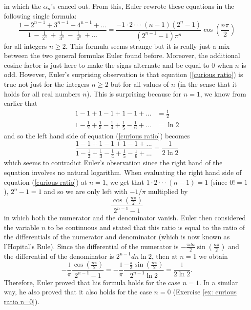 in which the $\alpha_n$'s cancel out. From this, Euler rewrote these equations in the following single formula:
\begin{equation} \label{curious ratio}
    \boxed{\frac{1 - 2^{n-1} + 3^{n-1} - 4^{n-1}+ ...}{\displaystyle 1 \, - \, \frac{1}{2^n} \ + \: \frac{1}{3^n} \ - \: \frac{1}{4^n} \ + ...} = \frac{-1\cdot 2 \cdot \cdot \cdot (n-1)(2^n - 1)}{(2^{n-1} - 1)\pi^n}\cos \left(\frac{n \pi }{2}\right)}
\end{equation}
for all integers $n \geq 2$. This formula seems strange but it is really just a mix between the two general formulas Euler found before. Moreover, the additional cosine factor is just here to make the signs alternate and be equal to $0$ when $n$ is odd. However, Euler's surprising observation is that equation (\ref{curious ratio}) is true not just for the integers $n \geq 2$ but for all values of $n$ (in the sense that it holds for all real numbers $n$). This is surprising because for $n = 1$, we know from earlier that
\begin{align*}
    1 - 1 + 1 - 1 + 1 - 1 + ... &= \frac{1}{2} \\
    1 - \frac{1}{2} + \frac{1}{3} - \frac{1}{4} + \frac{1}{5} - \frac{1}{6} + \dots &= \ln 2
\end{align*}
and so the left hand side of equation (\ref{curious ratio}) becomes
$$\frac{1 - 1 + 1 - 1 + 1 - 1 + ...}{\displaystyle 1 - \frac{1}{2} + \frac{1}{3} - \frac{1}{4} + \frac{1}{5} - \frac{1}{6} + \dots} = \frac{1}{2\ln 2}$$
which seems to contradict Euler's observation since the right hand of the equation involves no natural logarithm. When evaluating the right hand side of equation (\ref{curious ratio}) at $n = 1$, we get that $1\cdot 2 \cdot \cdot \cdot (n-1) = 1$ (since $0! = 1$), $2^n - 1 = 1$ and so we are only left with $-1/\pi$ multiplied by
$$\frac{\cos\left(\frac{n\pi}{2}\right)}{2^{n-1} - 1}$$
in which both the numerator and the denominator vanish. Euler then considered the variable $n$ to be continuous and stated that this ratio is equal to the ratio of the differentials of the numerator and denominator (which is now known as l'Hopital's Rule). Since the differential of the numerator is $-\frac{\pi dn}{2}\sin(\frac{n\pi}{2})$ and the differential of the denominator is $2^{n-1}dn \ln 2$, then at $n = 1$ we obtain
$$-\frac{1}{\pi}\frac{\cos\left(\frac{n\pi}{2}\right)}{2^{n-1} - 1} = -\frac{1}{\pi}\frac{-\frac{\pi}{2}\sin(\frac{n\pi}{2})}{2^{n-1}\ln 2} = \frac{1}{2\ln 2}.$$
Therefore, Euler proved that his formula holds for the case $n = 1$. In a similar way, he also proved that it also holds for the case $n = 0$ (Exercise \ref{ex: curious ratio n=0}).

